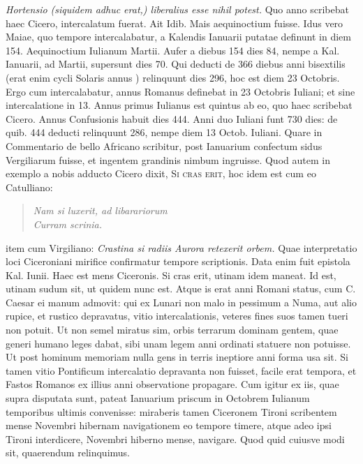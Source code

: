 \textit{Hortensio (siquidem
adhuc erat,) liberalius esse nihil potest.}
Quo anno scribebat haec
Cicero, intercalatum fuerat.
Ait Idib. %
Mais aequinoctium fuisse.
Idus
vero Maiae, quo tempore intercalabatur, a Kalendis Ianuarii putatae
definunt in diem 154.
Aequinoctium Iulianum  Martii.
Aufer
a diebus 154 dies 84, nempe a Kal. Ianuarii, %
 ad  Martii, supersunt
dies 70.
Qui deducti de 366 diebus anni bisextilis (erat enim cycli
Solaris annus ) relinquunt dies 296, hoc est diem 23 Octobris.
Ergo cum intercalabatur, annus Romanus definebat in 23
Octobris Iuliani; et sine intercalatione in 13.
Annus primus Iulianus
est quintus ab eo, quo haec scribebat Cicero.
Annus Confusionis
habuit dies 444.
Anni duo Iuliani funt 730 dies: de quib. %
444 deducti relinquunt 286, nempe diem 13 Octob. Iuliani. %
Quare in Commentario de bello Africano scribitur, post Ianuarium
confectum sidus Vergiliarum fuisse, et ingentem grandinis nimbum
ingruisse.
Quod autem in exemplo a nobis adducto Cicero dixit, \textsc{Si
cras erit}, hoc idem est cum eo Catulliano:
\begin{verse}
\textit{Nam si luxerit, ad libarariorum\\
Curram scrinia. \emd{}}
\end{verse}
item cum Virgiliano: \textit{Crastina si radiis Aurora retexerit orbem.}
Quae interpretatio loci Ciceroniani mirifice confirmatur tempore
scriptionis.
Data enim fuit epistola  Kal. Iunii. %
Haec est mens
Ciceronis.
Si cras erit, utinam idem maneat.
Id est, utinam sudum sit,
ut quidem nunc est.
Atque is erat anni Romani status, cum C. Caesar
ei manum admovit: qui ex Lunari non malo in pessimum a Numa,
aut alio rupice, et rustico depravatus, vitio intercalationis, veteres
fines suos tamen tueri non potuit.
Ut non semel miratus sim,
orbis terrarum dominam gentem, quae generi humano leges dabat,
sibi unam legem anni ordinati statuere non potuisse.
Ut post hominum
memoriam nulla gens in terris ineptiore anni forma usa sit.
Si
tamen vitio Pontificum intercalatio depravanta non fuisset, facile erat
tempora, et Fastos Romanos ex illius anni observatione propagare.
Cum igitur ex iis, quae supra disputata sunt, pateat Ianuarium priscum
in Octobrem Iulianum temporibus ultimis convenisse: miraberis
tamen Ciceronem Tironi scribentem mense Novembri hibernam
navigationem eo tempore timere, atque adeo ipsi Tironi interdicere,
Novembri hiberno mense, navigare.
Quod quid cuiusve modi sit,
quaerendum relinquimus.




































